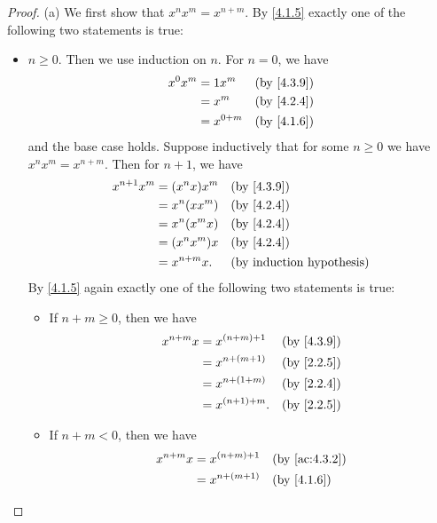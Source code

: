 \begin{proof}{(a)}
  We first show that \(x^n x^m = x^{n + m}\).
  By \cref{4.1.5} exactly one of the following two statements is true:
  \begin{itemize}
    \item \(n \geq 0\).
          Then we use induction on \(n\).
          For \(n = 0\), we have
          \begin{align*}
            x^0 x^m & = 1x^m      &  & \by{4.3.9} \\
                    & = x^m       &  & \by{4.2.4} \\
                    & = x^{0 + m} &  & \by{4.1.6}
          \end{align*}
          and the base case holds.
          Suppose inductively that for some \(n \geq 0\) we have \(x^n x^m = x^{n + m}\).
          Then for \(n + 1\), we have
          \begin{align*}
            x^{n + 1} x^m & = (x^n x) x^m  &  & \by{4.3.9} \\
                          & = x^n (x x^m)  &  & \by{4.2.4} \\
                          & = x^n (x^m x)  &  & \by{4.2.4} \\
                          & = (x^n x^m) x  &  & \by{4.2.4} \\
                          & = x^{n + m} x. &  & \byIH
          \end{align*}
          By \cref{4.1.5} again exactly one of the following two statements is true:
          \begin{itemize}
            \item If \(n + m \geq 0\), then we have
                  \begin{align*}
                    x^{n + m} x & = x^{(n + m) + 1}  &  & \by{4.3.9} \\
                                & = x^{n + (m + 1)}  &  & \by{2.2.5} \\
                                & = x^{n + (1 + m)}  &  & \by{2.2.4} \\
                                & = x^{(n + 1) + m}. &  & \by{2.2.5}
                  \end{align*}
            \item If \(n + m < 0\), then we have
                  \begin{align*}
                    x^{n + m} x & = x^{(n + m) + 1}  &  & \text{(by \cref{ac:4.3.2})} \\
                                & = x^{n + (m + 1)}  &  & \by{4.1.6}                  \\

\end{align*}
\end{itemize}
\end{itemize}
\end{proof}
